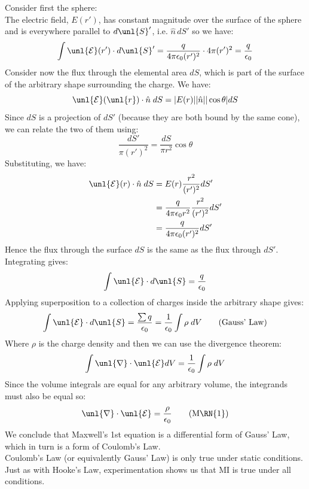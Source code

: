 \documentclass[a4paper, 11pt, normalem]{report}
\newcommand\E{\mathcal{E}}
\newcommand\uE{\unl{\E}}
\newcommand\del{\unl{\nabla}}
\newcommand\eno{\epsilon_0}
\newcommand\hn{\hat{n}}
\begin{document}
Consider first the sphere: \\
The electric field, $E(r')$, has constant magnitude over the surface of the sphere and is everywhere parallel to $d\unl{S}'$, i.e. $\hn\,dS'$ so we have:
\begin{equation*}
    \int \uE(r') \cdot d\unl{S}' = \frac{q}{4\pi\eno(r')^2}\cdot 4\pi(r')^2 = \frac{q}{\eno}
\end{equation*}
Consider now the flux through the elemental area $dS$, which is part of the surface of the arbitrary shape surrounding the charge.
We have:
\begin{equation*}
    \uE(\unl{r})\cdot \hn\;dS = |E(r)||\hn||\cos\theta|dS
\end{equation*}
Since $dS$ is a projection of $dS'$ (because they are both bound by the same cone), we can relate the two of them using:
\begin{equation*}
    \frac{dS'}{\pi(r')^2} = \frac{dS}{\pi r^2}\cos\theta
\end{equation*}
Substituting, we have:
\begin{align*}
    \uE(r)\cdot\hn\;dS &= E(r)\frac{r^2}{(r')^2}dS' \\
    &= \frac{q}{4\pi\eno r^2}\frac{r^2}{(r')^2} dS' \\
    &= \frac{q}{4\pi\eno(r')^2}dS'
\end{align*}
Hence the flux through the surface $dS$ is the same as the flux through $dS'$. \\
Integrating gives:
\begin{equation*}
    \int \uE\cdot d\unl{S} = \frac{q}{\eno}
\end{equation*}
Applying superposition to a collection of charges inside the arbitrary shape gives:
\begin{equation}
    \int \uE\cdot d\unl{S} = \frac{\sum q}{\eno} = \frac{1}{\eno}\int \rho\;dV \tag{Gauss' Law}
\end{equation}
Where $\rho$ is the charge density and then we can use the divergence theorem:
\begin{equation*}
    \int \del \cdot \uE dV = \frac{1}{\eno} \int \rho\;dV
\end{equation*}
Since the volume integrals are equal for any arbitrary volume, the integrands must also be equal so:
\begin{equation*}
    \del \cdot \uE = \frac{\rho}{\eno} \tag{M\RN{1}}
\end{equation*}
We conclude that Maxwell's 1st equation is a differential form of Gauss' Law, which in turn is a form of Coulomb's Law. \\
Coulomb's Law (or equivalently Gauss' Law) is only true under static conditions.
Just as with Hooke's Law, experimentation shows us that M\RN{1} is true under all conditions.
\end{document}
